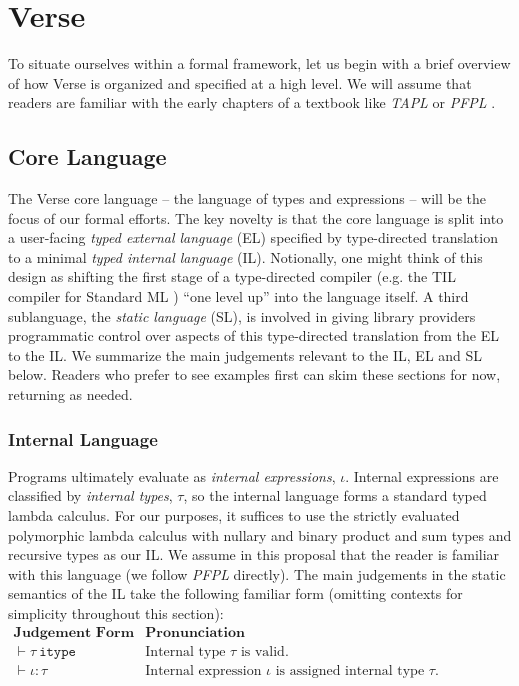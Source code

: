 \section{Verse}\label{sec:verse}
To situate ourselves within a formal framework, let us begin with a brief overview of how Verse is organized and specified at a high level. We will assume that readers are familiar with the early chapters of a textbook like \emph{TAPL} \cite{tapl} or \emph{PFPL} \cite{pfpl}.%

\subsection{Core Language}
The Verse core language -- the language of types and expressions -- will be the focus of our formal efforts. The key novelty is that the core language is split into a user-facing \emph{typed external language} (EL) specified by type-directed translation to a minimal \emph{typed internal language} (IL). Notionally, one might think of this design as shifting the first stage of a type-directed compiler (e.g. the TIL compiler for Standard ML \cite{tarditi+:til-OLD})  ``one level up'' into the language itself. A third sublanguage, the \emph{static language} (SL), is involved in giving library providers programmatic control over aspects of this type-directed translation from the EL to the IL. %
We summarize the main judgements relevant to the IL, EL and SL below. Readers who prefer to see examples first can skim these sections for now, returning as needed.

\subsubsection{Internal Language}
Programs ultimately evaluate as \emph{internal expressions}, $\iota$. Internal expressions are classified by \emph{internal types}, $\tau$, so the internal language forms a standard typed lambda calculus. For our purposes, it suffices to use the strictly evaluated polymorphic lambda calculus with nullary and binary product and sum types and recursive types as our IL. We assume in this proposal that the reader is familiar with this language (we follow \emph{PFPL} \cite{pfpl} directly). The main judgements in the static semantics of the IL take the following familiar form (omitting contexts for simplicity throughout this section):
\\[1ex]
$
\begin{array}{ll}
\textbf{Judgement Form} & \textbf{Pronunciation}\\
\vdash \tau~\mathtt{itype} & \text{Internal type $\tau$ is valid.}\\
\vdash \iota : \tau & \text{Internal expression $\iota$ is assigned internal type $\tau$.}
\end{array}
$\\

